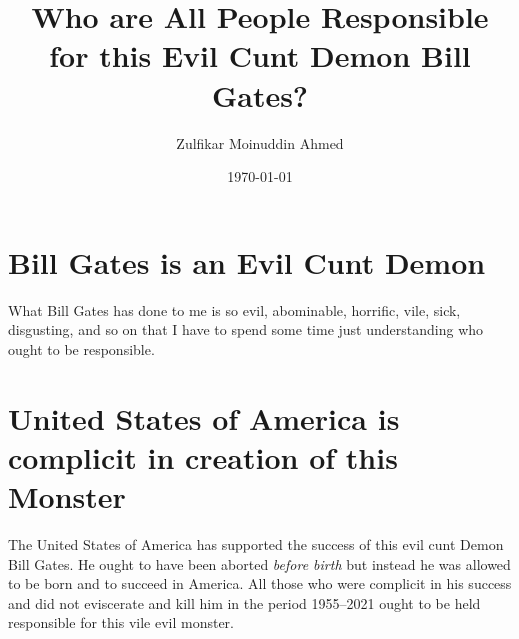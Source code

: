 \documentclass{amsart}
\title{Who are All People Responsible for this Evil Cunt Demon Bill Gates?}
\author{Zulfikar Moinuddin Ahmed}
\date{\today}
\begin{document}
\maketitle

\section{Bill Gates is an Evil Cunt Demon}

What Bill Gates has done to me is so evil, abominable, horrific, vile, sick, disgusting, and so on that I have to spend some time just understanding who ought to be responsible.

\section{United States of America is complicit in creation of this Monster}

The United States of America has supported the success of this evil cunt Demon Bill Gates.  He ought to have been aborted {\em before birth} but instead he was allowed to be born and to succeed in America.  All those who were complicit in his success and did not eviscerate and kill him in the period 1955--2021 ought to be held responsible for this vile evil monster.
\end{document}
